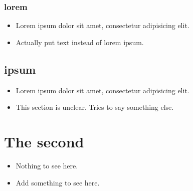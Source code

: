 \subsection{lorem}
\label{autosec:4}
    \begin{itemize}[noitemsep]
        \item Lorem ipsum dolor sit amet, consectetur adipisicing elit.
        \item {\color{red}Actually put text instead of lorem ipsum.}
    \end{itemize}
\section{ipsum}
\label{autosec:5}
    \begin{itemize}[noitemsep]
        \item Lorem ipsum dolor sit amet, consectetur adipisicing elit.
        \item {\color{OliveGreen}This section is unclear.}
{\color{OliveGreen}Tries to say something else.}
    \end{itemize}
\chapter{The second}
\label{autosec:6}
    \begin{itemize}[noitemsep]
        \item Nothing to see here.
        \item {\color{red}Add something to see here.}
    \end{itemize}

